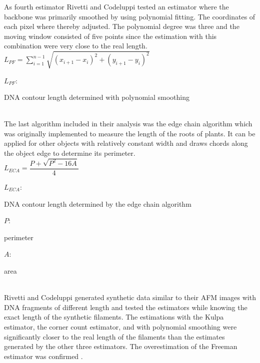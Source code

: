 \documentclass{article}
\begin{document}
As fourth estimator Rivetti and Codeluppi tested an estimator where the backbone was primarily smoothed by using polynomial fitting. The coordinates of each pixel where thereby adjusted. The polynomial degree was three and the moving window consisted of five points since the estimation with this combination were very close to the real length. \\ 

$ L_{PF} = \sum_{i=1}^{n-1} \sqrt{(x_{i+1}-x_{i})^{2} + (y_{i+1}-y_{i})^{2}} $

\hspace{0,2cm}

$ L_{PF} $: \begin{footnotesize}
DNA contour length determined with polynomial smoothing
\end{footnotesize} \\



The last algorithm included in their analysis was the edge chain algorithm which was originally implemented to measure the length of the roots of plants. It can be applied for other objects with relatively constant width and draws chords along the object edge to determine its perimeter. \\

$ L_{ECA}=\dfrac{P+\sqrt{P^{2}-16A}}{4} $

\hspace{0,2cm}

$ L_{ECA} $: \begin{footnotesize}
DNA contour length determined by the edge chain algorithm 
\end{footnotesize} 

$ P $:\begin{footnotesize}
perimeter
\end{footnotesize} 

$ A $:\begin{footnotesize}
area
\end{footnotesize} \\

Rivetti and Codeluppi generated synthetic data similar to their AFM images with DNA fragments of different length and tested the estimators while knowing the exact length of the synthetic filaments. The estimations with the Kulpa estimator, the corner count estimator, and with polynomial smoothing were significantly closer to the real length of the filaments than the estimates generated by the other three estimators. The overestimation of the Freeman estimator was confirmed  \cite{rivetti2001accurate}.
\end{document}
